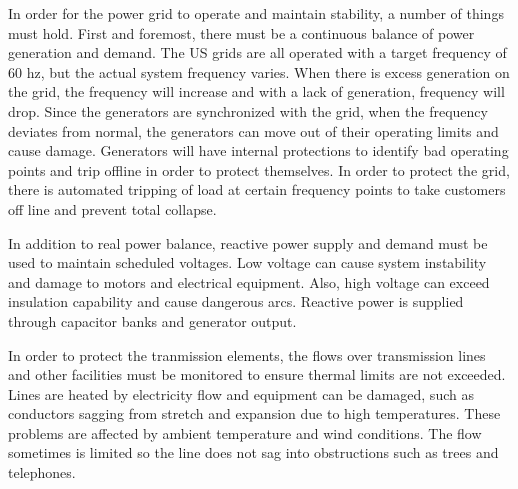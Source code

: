 In order for the power grid to operate and maintain stability, a number of things must hold.  First and foremost, there must be a continuous balance of power generation and demand.  The US grids are all operated with a target frequency of 60 hz, but the actual system frequency varies.  When there is excess generation on the grid, the frequency will increase and with a lack of generation, frequency will drop.  Since the generators are synchronized with the grid, when the frequency deviates from normal, the generators can move out of their operating limits and cause damage.  Generators will have internal protections to identify bad operating points and trip offline in order to protect themselves.  In order to protect the grid, there is automated tripping of load at certain frequency points to take customers off line and prevent total collapse.  

In addition to real power balance, reactive power supply and demand must be used to maintain scheduled voltages.  Low voltage can cause system instability and damage to motors and electrical equipment.  Also, high voltage can exceed insulation capability and cause dangerous arcs.  Reactive power is supplied through capacitor banks and generator output.

In order to protect the tranmission elements, the flows over transmission lines and other facilities must be monitored to ensure thermal limits are not exceeded.  Lines are heated by electricity flow and equipment can be damaged, such as conductors sagging from stretch and expansion due to high temperatures.  These problems are affected by ambient temperature and wind conditions.  The flow sometimes is limited so the line does not sag into obstructions such as trees and telephones.

